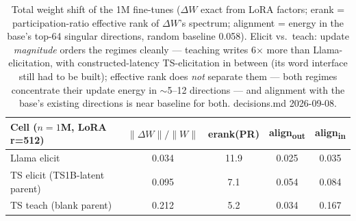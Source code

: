 \begin{table}[t]
\centering
\begin{tabular}{lcccc}
\hline
Cell ($n=1$M, LoRA r=512) & $\|\Delta W\|/\|W\|$ & erank(PR) & align\textsubscript{out} & align\textsubscript{in} \\
\hline
Llama elicit & 0.034 & 11.9 & 0.025 & 0.035 \\
TS elicit (TS1B-latent parent) & 0.095 & 7.1 & 0.054 & 0.084 \\
TS teach (blank parent) & 0.212 & 5.2 & 0.034 & 0.167 \\
\hline
\end{tabular}
\caption{Total weight shift of the 1M fine-tunes ($\Delta W$ exact from LoRA factors; erank = participation-ratio effective rank of $\Delta W$'s spectrum; alignment = energy in the base's top-64 singular directions, random baseline 0.058). Elicit vs.\ teach: update \emph{magnitude} orders the regimes cleanly --- teaching writes 6$\times$ more than Llama-elicitation, with constructed-latency TS-elicitation in between (its word interface still had to be built); effective rank does \emph{not} separate them --- both regimes concentrate their update energy in $\sim$5--12 directions --- and alignment with the base's existing directions is near baseline for both. decisions.md 2026-09-08.}
\label{tab:weight_shift}
\end{table}
